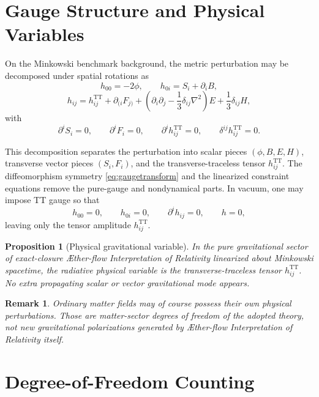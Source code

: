 \documentclass[11pt]{article}
\newcommand{\Aflow}{\AE{}ther-flow}
\newcommand{\TheoryName}{\Aflow{} Interpretation of Relativity}
\newcommand{\TT}{\mathrm{TT}}
\newtheorem{proposition}{Proposition}
\newtheorem{remark}{Remark}
\begin{document}
\section{Gauge Structure and Physical Variables}

On the Minkowski benchmark background, the metric perturbation may be decomposed under spatial rotations as
\begin{equation}
h_{00}=-2\phi,
\qquad
h_{0i}=S_i+\partial_i B,
\label{eq:decomp1}
\end{equation}
\begin{equation}
h_{ij}
=
h_{ij}^{\TT}
+
\partial_{(i}F_{j)}
+
\left(\partial_i\partial_j-\frac{1}{3}\delta_{ij}\nabla^2\right)E
+
\frac{1}{3}\delta_{ij}H,
\label{eq:decomp2}
\end{equation}
with
\begin{equation}
\partial^i S_i=0,
\qquad
\partial^i F_i=0,
\qquad
\partial^i h_{ij}^{\TT}=0,
\qquad
\delta^{ij}h_{ij}^{\TT}=0.
\label{eq:ttconditions}
\end{equation}

This decomposition separates the perturbation into scalar pieces \((\phi,B,E,H)\), transverse vector pieces \((S_i,F_i)\), and the transverse-traceless tensor \(h_{ij}^{\TT}\). The diffeomorphism symmetry \eqref{eq:gaugetransform} and the linearized constraint equations remove the pure-gauge and nondynamical parts. In vacuum, one may impose TT gauge so that
\begin{equation}
h_{00}=0,
\qquad
h_{0i}=0,
\qquad
\partial^i h_{ij}=0,
\qquad
h=0,
\label{eq:ttgauge}
\end{equation}
leaving only the tensor amplitude \(h_{ij}^{\TT}\).

\begin{proposition}[Physical gravitational variable]
In the pure gravitational sector of exact-closure \TheoryName{} linearized about Minkowski spacetime, the radiative physical variable is the transverse-traceless tensor \(h_{ij}^{\TT}\). No extra propagating scalar or vector gravitational mode appears.
\end{proposition}

\begin{remark}
Ordinary matter fields may of course possess their own physical perturbations. Those are matter-sector degrees of freedom of the adopted theory, not new gravitational polarizations generated by \TheoryName{} itself.
\end{remark}

\section{Degree-of-Freedom Counting}
\end{document}
